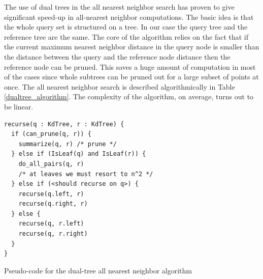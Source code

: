 \documentclass[12pt,letterpaper,doublespaced,ETD,dvips,proposal]{gtthesis}
\begin{document}
\begin{Body}
The use of dual trees in the all nearest neighbor search has proven
to give significant speed-up in all-nearest neighbor computations.
The basic idea is that the whole query set is structured on a tree.
In our case the query tree and the reference tree are the same. The
core of the algorithm relies on the fact that if the current maximum
nearest neighbor distance in the query node is smaller than the
distance between the query and the reference node distance then the
reference node can be pruned. This saves a huge amount of
computation in most of the cases since whole  subtrees can be pruned
out for a large subset of points at once. The all nearest neighbor
search is described algorithmically in Table
\ref{dualtree_algorithm}. The complexity of the algorithm, on
average, turns out to be linear.

\begin{table}
\begin{verbatim}
recurse(q : KdTree, r : KdTree) {
  if (can_prune(q, r)) {
    summarize(q, r) /* prune */
  } else if (IsLeaf(q) and IsLeaf(r)) {
    do_all_pairs(q, r)
    /* at leaves we must resort to n^2 */
  } else if (<should recurse on q>) {
    recurse(q.left, r)
    recurse(q.right, r)
  } else {
    recurse(q, r.left)
    recurse(q, r.right)
  }
}
\end{verbatim}
\caption{Pseudo-code for the dual-tree all nearest neighbor
algorithm} \label{dualtree_algorithm}
\end{table}








\end{Body}
\end{document}
